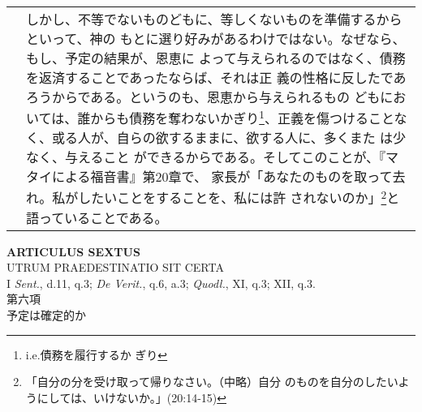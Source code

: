 \documentclass[10pt]{jsarticle} %
\begin{document}
\begin{longtable}{p{21em}p{21em}}
&

しかし、不等でないものどもに、等しくないものを準備するからといって、神の
 もとに選り好みがあるわけではない。なぜなら、もし、予定の結果が、恩恵に
 よって与えられるのではなく、債務を返済することであったならば、それは正
 義の性格に反したであろうからである。というのも、恩恵から与えられるもの
 どもにおいては、誰からも債務を奪わないかぎり\footnote{i.e.債務を履行するか
 ぎり}、正義を傷つけることなく、或る人が、自らの欲するままに、欲する人に、多くまた
 は少なく、与えること
 ができるからである。そしてこのことが、『マタイによる福音書』第20章で、
 家長が「あなたのものを取って去れ。私がしたいことをすることを、私には許
 されないのか」\footnote{「自分の分を受け取って帰りなさい。（中略）自分
 のものを自分のしたいようにしては、いけないか。」(20:14-15)}と語っていることである。




\end{longtable}
\newpage







\begin{center}
 {\Large {\bf ARTICULUS SEXTUS}}\\
 {\large UTRUM PRAEDESTINATIO SIT CERTA}\\
 {\footnotesize I {\itshape Sent.}, d.11, q.3; {\itshape De Verit.},
 q.6, a.3; {\itshape Quodl.}, XI, q.3; XII, q.3.}\\
 {\Large 第六項\\予定は確定的か}
\end{center}
\end{document}
